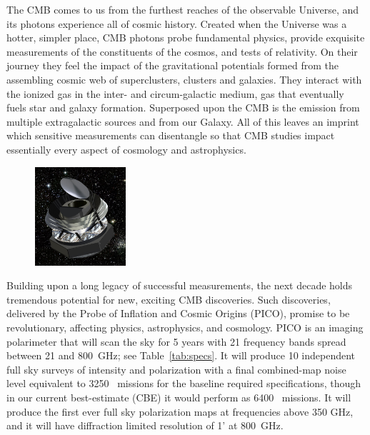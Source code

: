\documentclass[PICOReport.tex]{subfiles}
\begin{document}

The \ac{CMB} comes to us from the furthest reaches of the observable Universe, and its photons experience all of cosmic history.  Created when the Universe was a hotter, simpler place, CMB photons probe fundamental physics, provide exquisite measurements of the constituents of the cosmos, and tests of relativity.  On their journey they feel the impact of the gravitational potentials formed from the assembling cosmic web of superclusters, clusters and galaxies.  They interact with the ionized gas in the inter- and circum-galactic medium, gas that eventually fuels star and galaxy formation.  Superposed upon the CMB is the emission from multiple extragalactic sources and from our Galaxy.  All of this leaves an imprint which sensitive measurements can disentangle so that CMB studies impact essentially every aspect of cosmology and astrophysics.

\begin{figure}  %
\includegraphics[width=0.30\textwidth]{figures/PICO_rendered.jpg}
\end{figure}

Building upon a long legacy of successful measurements, the next decade holds tremendous potential for new, exciting \ac{CMB} discoveries.  Such discoveries, delivered by the Probe of Inflation and Cosmic Origins (PICO), promise to be revolutionary, affecting physics, astrophysics, and cosmology. PICO is an imaging polarimeter that will scan the sky for 5 years with 21 frequency bands spread between 21 and 800~GHz; see Table~\ref{tab:specs}. It will produce 10 independent full sky surveys of intensity and polarization with a final combined-map noise level equivalent to 3250 \planck\ missions for the baseline required specifications, though in our current best-estimate (CBE) it would perform as 6400 \planck\ missions.  It will produce the first ever full sky polarization maps at frequencies above 350 GHz, and it will have diffraction limited resolution of 1' at 800~GHz. 
\end{document}
